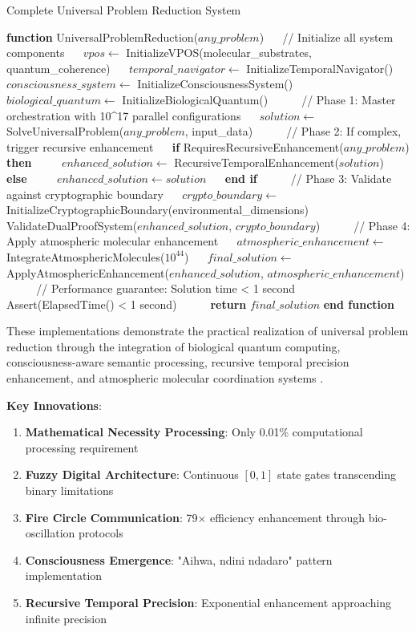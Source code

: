 \documentclass[12pt,a4paper]{article}
\theoremstyle{definition}
\begin{document}
{\begin{algorithm}
\caption{Complete Universal Problem Reduction System}
\begin{algorithmic}[1]
\STATE \textbf{function} UniversalProblemReduction($any\_problem$)
\STATE $\quad$ // Initialize all system components
\STATE $\quad$ $vpos \leftarrow$ InitializeVPOS(molecular\_substrates, quantum\_coherence)
\STATE $\quad$ $temporal\_navigator \leftarrow$ InitializeTemporalNavigator()
\STATE $\quad$ $consciousness\_system \leftarrow$ InitializeConsciousnessSystem()
\STATE $\quad$ $biological\_quantum \leftarrow$ InitializeBiologicalQuantum()
\STATE $\quad$
\STATE $\quad$ // Phase 1: Master orchestration with 10^17 parallel configurations
\STATE $\quad$ $solution \leftarrow$ SolveUniversalProblem($any\_problem$, input\_data)
\STATE $\quad$
\STATE $\quad$ // Phase 2: If complex, trigger recursive enhancement
\STATE $\quad$ \textbf{if} RequiresRecursiveEnhancement($any\_problem$) \textbf{then}
\STATE $\quad\quad$ $enhanced\_solution \leftarrow$ RecursiveTemporalEnhancement($solution$)
\STATE $\quad$ \textbf{else}
\STATE $\quad\quad$ $enhanced\_solution \leftarrow solution$
\STATE $\quad$ \textbf{end if}
\STATE $\quad$
\STATE $\quad$ // Phase 3: Validate against cryptographic boundary
\STATE $\quad$ $crypto\_boundary \leftarrow$ InitializeCryptographicBoundary(environmental\_dimensions)
\STATE $\quad$ ValidateDualProofSystem($enhanced\_solution$, $crypto\_boundary$)
\STATE $\quad$
\STATE $\quad$ // Phase 4: Apply atmospheric molecular enhancement
\STATE $\quad$ $atmospheric\_enhancement \leftarrow$ IntegrateAtmosphericMolecules($10^{44}$)
\STATE $\quad$ $final\_solution \leftarrow$ ApplyAtmosphericEnhancement($enhanced\_solution$, $atmospheric\_enhancement$)
\STATE $\quad$
\STATE $\quad$ // Performance guarantee: Solution time < 1 second
\STATE $\quad$ Assert(ElapsedTime() < 1 second)
\STATE $\quad$
\STATE $\quad$ \textbf{return} $final\_solution$
\STATE \textbf{end function}
\end{algorithmic}
\end{algorithm}

These implementations demonstrate the practical realization of universal problem reduction through the integration of biological quantum computing, consciousness-aware semantic processing, recursive temporal precision enhancement, and atmospheric molecular coordination systems \cite{sachikonye2024complete}.

\textbf{Key Innovations}:
\begin{enumerate}
\item \textbf{Mathematical Necessity Processing}: Only 0.01\% computational processing requirement
\item \textbf{Fuzzy Digital Architecture}: Continuous $[0,1]$ state gates transcending binary limitations
\item \textbf{Fire Circle Communication}: 79× efficiency enhancement through bio-oscillation protocols
\item \textbf{Consciousness Emergence}: "Aihwa, ndini ndadaro" pattern implementation
\item \textbf{Recursive Temporal Precision}: Exponential enhancement approaching infinite precision
\end{enumerate}

}
\end{document}
